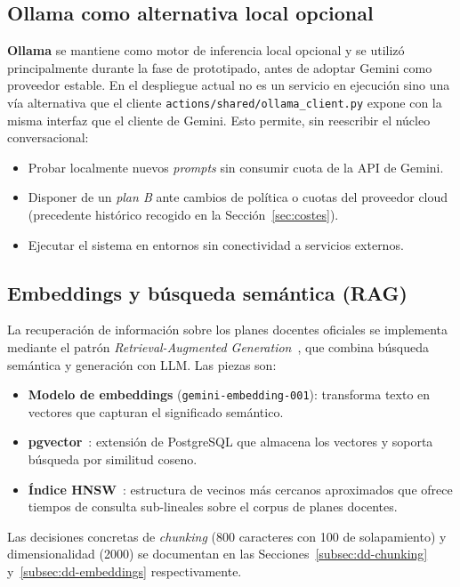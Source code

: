 \subsection{Ollama como alternativa local opcional}

\textbf{Ollama} se mantiene como motor de inferencia local opcional y se utilizó principalmente durante la fase de prototipado, antes de adoptar Gemini como proveedor estable. En el despliegue actual no es un servicio en ejecución sino una vía alternativa que el cliente \texttt{actions/shared/ollama\_client.py} expone con la misma interfaz que el cliente de Gemini. Esto permite, sin reescribir el núcleo conversacional:

\begin{itemize}
    \item Probar localmente nuevos \textit{prompts} sin consumir cuota de la API de Gemini.
    \item Disponer de un \textit{plan B} ante cambios de política o cuotas del proveedor cloud (precedente histórico recogido en la Sección~\ref{sec:costes}).
    \item Ejecutar el sistema en entornos sin conectividad a servicios externos.
\end{itemize}

\subsection{Embeddings y búsqueda semántica (RAG)}

La recuperación de información sobre los planes docentes oficiales se implementa mediante el patrón \textit{Retrieval-Augmented Generation}~\cite{lewis2020retrieval}, que combina búsqueda semántica y generación con LLM. Las piezas son:

\begin{itemize}
    \item \textbf{Modelo de embeddings} (\texttt{gemini-embedding-001}): transforma texto en vectores que capturan el significado semántico.
    \item \textbf{pgvector}~\cite{pgvectorgithub}: extensión de PostgreSQL que almacena los vectores y soporta búsqueda por similitud coseno.
    \item \textbf{Índice HNSW}~\cite{malkov2018hnsw}: estructura de vecinos más cercanos aproximados que ofrece tiempos de consulta sub-lineales sobre el corpus de planes docentes.
\end{itemize}

Las decisiones concretas de \textit{chunking} (800 caracteres con 100 de solapamiento) y dimensionalidad (2000) se documentan en las Secciones~\ref{subsec:dd-chunking} y~\ref{subsec:dd-embeddings} respectivamente.

